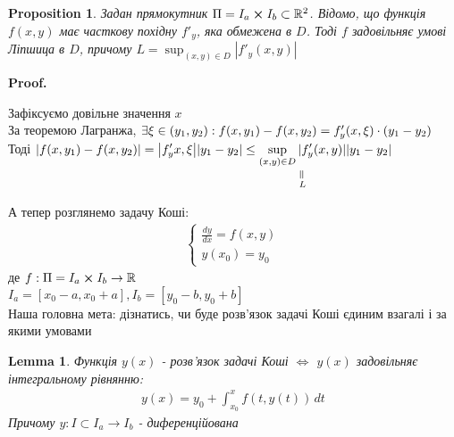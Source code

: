 \documentclass[a4paper, 10pt]{article}
\makeatletter
\def\qed{$\blacksquare$}
\theoremstyle{theoremdd}
\theoremstyle{theoremdd}
\theoremstyle{theoremdd}
\theoremstyle{theoremdd}
\theoremstyle{theoremdd}
\newtheorem{proposition}[theorem]{Proposition}
\theoremstyle{theoremdd}
\theoremstyle{theoremdd}
\newtheorem{lemma}[theorem]{Lemma}
\theoremstyle{theoremdd}
\renewenvironment{proof}[1][Proof.\\]{\par
\pushQED{\hfill \qed}%
\normalfont \topsep6\p@\@plus6\p@\relax
\trivlist
\item\relax
{\bfseries
#1\@addpunct{.}}\hspace\labelsep\ignorespaces
}{%
\popQED\endtrivlist\@endpefalse
}
\makeatother
\begin{document}
	\begin{proposition}
 Задан прямокутник $\Pi = I_a \cross I_b \subset \mathbb{R}^2$. Відомо, що функція $f(x,y)$ має часткову похідну $f'_y$, яка обмежена в $D$. Тоді $f$ задовільняє умові Ліпшица в $D$, причому $\displaystyle L = \sup_{(x,y) \in D} |f'_y(x,y)|$
	\end{proposition}

	\begin{proof}
	Зафіксуємо довільне значення $x$\\
	За теоремою Лагранжа, $\exists \xi \in (y_1, y_2):\\f(x,y_1) - f(x,y_2) = f'_y(x, \xi)\cdot(y_1-y_2)$\\
	Тоді $\displaystyle \abs{f(x,y_1) - f(x,y_2)} = \abs{f'_y{x, \xi}} \abs{y_1 - y_2} \leq \underset{\displaystyle \underset{L}{\rotatebox[origin=c]{90}{=}}}{\sup_{(x,y) \in D} |f'_y(x,y)|} \abs{y_1-y_2}$ 
\end{proof}
	
	А тепер розглянемо задачу Коші:
	\begin{align*}
	\begin{cases}
	\displaystyle \frac{dy}{dx}=f(x,y)\\
	y(x_0)=y_0
	\end{cases}
	\end{align*}
	де $f: \Pi = I_a \cross I_b \rightarrow \mathbb{R}$\\
	$I_a = [x_0-a, x_0+a], I_b = [y_0-b, y_0+b]$\\
	Наша головна мета: дізнатись, чи буде розв'язок задачі Коші єдиним взагалі і за якими умовами
	
	\begin{lemma}
 Функція $y(x)$ - розв'язок задачі Коші $\iff$ $y(x)$ задовільняє інтегральному рівнянню:
	\begin{align*}
	y(x) = y_0 + \int_{x_0}^x f(t,y(t))\,dt
	\end{align*}
	Причому $y: I \subset I_a \rightarrow I_b$ - диференційована
	\end{lemma}
	
\end{document}
